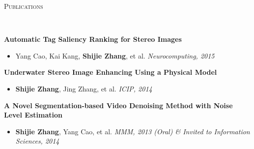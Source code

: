 \documentclass[3pt]{article}
\newenvironment{changemargin}[2]{%
  \begin{list}{}{%
    \setlength{\topsep}{0pt}%
    \setlength{\leftmargin}{#1}%
    \setlength{\rightmargin}{#2}%
    \setlength{\listparindent}{\parindent}%
    \setlength{\itemindent}{\parindent}%
    \setlength{\parsep}{\parskip}%
  }%
  \item[]}{\end{list}
}
\newcommand{\lineover}{
	\begin{changemargin}{-0.05in}{-0.05in}
		\vspace*{-8pt}
		\hrulefill \\
		\vspace*{-2pt}
	\end{changemargin}
}
\newcommand{\header}[1]{
	\begin{changemargin}{-0.5in}{-0.5in}
		{\Large \scshape{#1}}\\
  	\lineover
	\end{changemargin}
}
\newenvironment{body} {
	\vspace*{-16pt}
	\begin{changemargin}{-0.25in}{-0.5in}
  }	
	{\end{changemargin}
}
\begin{document}
\bigskip



%	


 
	

\header{Publications}

\begin{body}
	\vspace{18pt}	

	\textbf{ Automatic Tag Saliency Ranking for Stereo Images}
     \begin{itemize} \itemsep -0pt
	\item{Yang Cao, Kai Kang, \textbf{Shijie Zhang}, et al. } \hfill \emph{Neurocomputing, 2015  }
           \end{itemize}	

	\textbf{ Underwater Stereo Image Enhancing Using a Physical Model }
     \begin{itemize} \itemsep -0pt
	\item{\textbf{Shijie Zhang}, Jing Zhang, et al. } \hfill \emph{ICIP, 2014 }
           \end{itemize}	

	\textbf{ A Novel Segmentation-based Video Denoising Method with Noise Level Estimation }
     \begin{itemize} \itemsep -0pt
	\item{\textbf{Shijie Zhang}, Yang Cao, et al. } \hfill \emph{MMM, 2013 (Oral) \& Invited to Information Sciences, 2014  }
           \end{itemize}	

\end{body}
\end{document}
